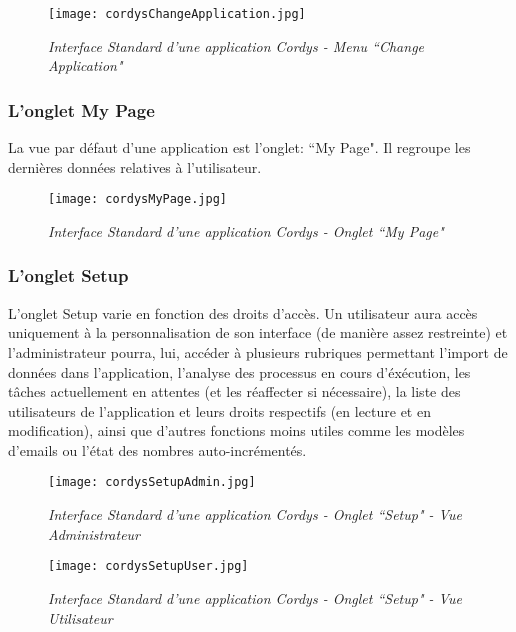  \begin{figure}[H]
    \centering
    \texttt{[image: cordysChangeApplication.jpg]}
	\caption{\textit{Interface Standard d'une application Cordys - Menu ``Change Application"}}\label{image.CordysChangeApplication} 
\end{figure}

\subsubsection{L'onglet My Page}

La vue par défaut d'une application est l'onglet: ``My Page". Il regroupe les dernières données relatives à l'utilisateur.

 \begin{figure}[H]
    \centering
    \texttt{[image: cordysMyPage.jpg]}
	\caption{\textit{Interface Standard d'une application Cordys - Onglet ``My Page"}}\label{image.CordysMyPage} 
\end{figure}

\subsubsection{L'onglet Setup}

L'onglet Setup varie en fonction des droits d'accès. Un utilisateur aura accès uniquement à la personnalisation de son interface (de manière assez restreinte) et l'administrateur pourra, lui, accéder à plusieurs rubriques permettant l'import de données dans l'application, l'analyse des processus en cours d'éxécution, les tâches actuellement en attentes (et les réaffecter si nécessaire), la liste des utilisateurs de l'application et leurs droits respectifs (en lecture et en modification), ainsi que d'autres fonctions moins utiles comme les modèles d'emails ou l'état des nombres auto-incrémentés.

 \begin{figure}[H]
    \centering
    \texttt{[image: cordysSetupAdmin.jpg]}
	\caption{\textit{Interface Standard d'une application Cordys - Onglet ``Setup" - Vue Administrateur}}\label{image.CordysSetupAdmin} 
\end{figure}

 \begin{figure}[H]
    \centering
    \texttt{[image: cordysSetupUser.jpg]}
	\caption{\textit{Interface Standard d'une application Cordys - Onglet ``Setup" - Vue Utilisateur}}\label{image.CordysSetupUser} 
\end{figure}

